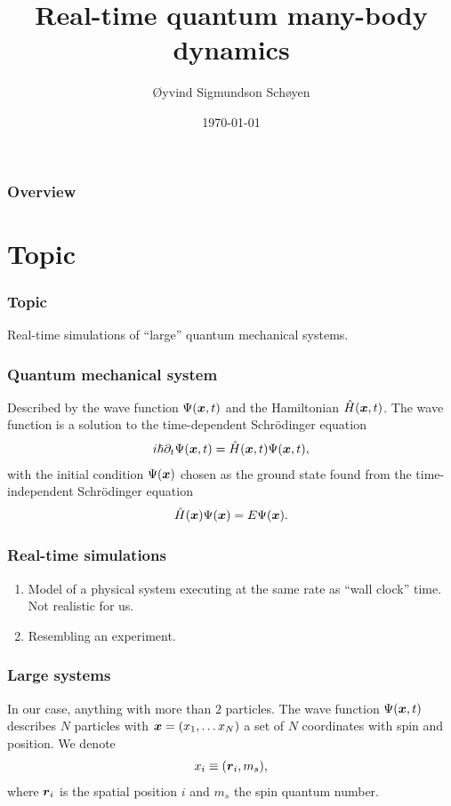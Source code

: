 \documentclass{beamer}
\author{Øyvind Sigmundson Schøyen}
\title{Real-time quantum many-body dynamics}
\institute{University of Oslo}
\date{\today}
\begin{document}
\begin{frame}
    \titlepage
\end{frame}
\begin{frame}
    \frametitle{Overview}
    \tableofcontents
\end{frame}

\section{Topic}

\begin{frame}
    \frametitle{Topic}
    Real-time simulations of ``large'' quantum mechanical systems.
\end{frame}

\begin{frame}
    \frametitle{Quantum mechanical system}
    Described by the wave function $\Psi(\boldsymbol{x}, t)$ and the Hamiltonian
    $\hat{H}(\boldsymbol{x}, t)$.
    The wave function is a solution to the time-dependent Schrödinger equation
    \begin{align}
        i\hslash \partial_t\Psi(\boldsymbol{x}, t)
        = \hat{H}(\boldsymbol{x}, t)\Psi(\boldsymbol{x}, t),
    \end{align}
    with the initial condition $\Psi(\boldsymbol{x})$ chosen as the ground state found
    from the time-independent Schrödinger equation
    \begin{align}
        \hat{H}(\boldsymbol{x})\Psi(\boldsymbol{x}) = E\Psi(\boldsymbol{x}).
    \end{align}
\end{frame}

\begin{frame}
    \frametitle{Real-time simulations}
    \begin{enumerate}
        \item Model of a physical system executing at the same rate as ``wall
            clock'' time.
            Not realistic for us.
        \item Resembling an experiment.
    \end{enumerate}
\end{frame}

\begin{frame}
    \frametitle{Large systems}
    In our case, anything with more than $2$ particles.
    The wave function $\Psi(\boldsymbol{x}, t)$ describes $N$ particles with $\boldsymbol{x} =
    (x_1, \dots x_N)$ a set of $N$ coordinates with spin and position.
    We denote
    \begin{align}
        x_i \equiv (\boldsymbol{r}_i, m_s),
    \end{align}
    where $\boldsymbol{r}_i$ is the spatial position $i$ and $m_s$ the spin quantum
    number.
\end{frame}
\end{document}

